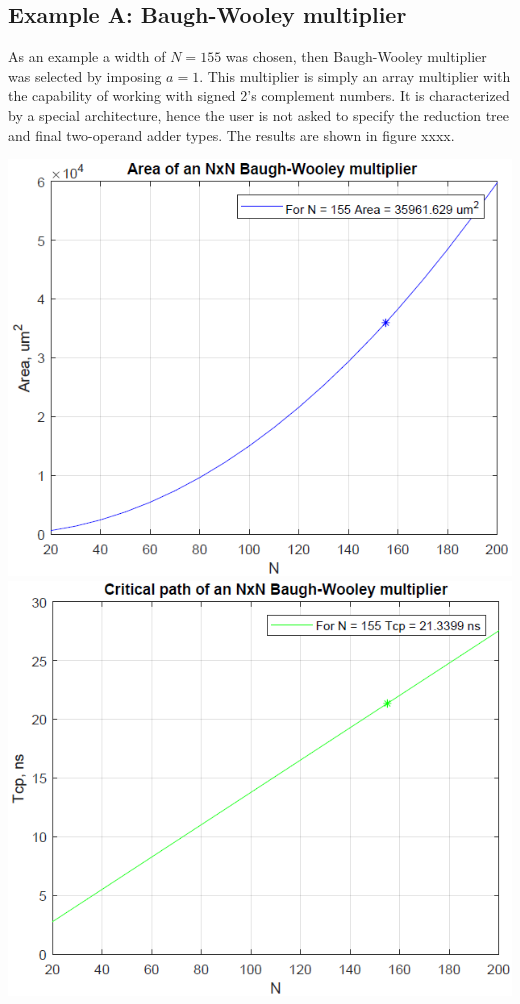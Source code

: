 \documentclass[11pt]{article} %
\begin{document}
\subsection{Example A: Baugh-Wooley multiplier}
As an example a width of $N = 155$ was chosen, then Baugh-Wooley multiplier was selected by imposing $a=1$. This multiplier is simply an array multiplier with the capability of working with signed 2's complement numbers. It is characterized by a special architecture, hence the user is not asked to specify the reduction tree and final two-operand adder types. The results are shown in figure xxxx.
\vspace{1em}
\begin{center}
\includegraphics[scale=.48]{area_bw.PNG}
\includegraphics[scale=.48]{tcp_bw.PNG}\\

\end{center}
\end{document}
